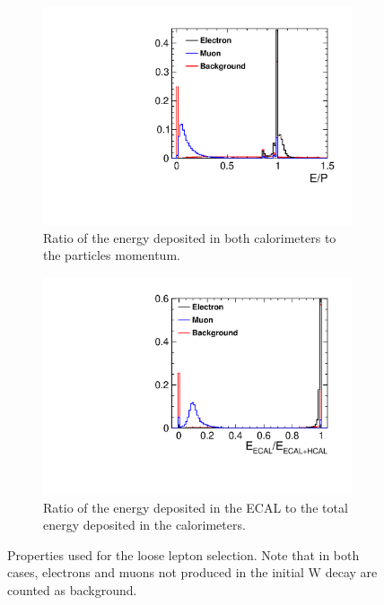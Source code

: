 \begin{figure}
  \centering
  \begin{subfigure}[t]{.48\textwidth}
    \centering
    \includegraphics[width=1.0\linewidth,keepaspectratio]{HiggsAnalysis/figures/EByP}
    \caption{Ratio of the energy deposited in both calorimeters to the particles momentum.}
  \end{subfigure}%
    \vspace{4ex}
  \begin{subfigure}[t]{.48\textwidth}
    \centering
    \includegraphics[width=1.0\linewidth,keepaspectratio]{HiggsAnalysis/figures/ECALByE}
    \caption{Ratio of the energy deposited in the ECAL to the total energy deposited in the calorimeters. }
  \end{subfigure}
  \caption[Parameters used for loose lepton selection]{Properties used for the loose lepton selection.  Note that in both cases, electrons and muons not produced in the initial W decay are counted as background.}
  \label{fig:lepfinding}
\end{figure}

